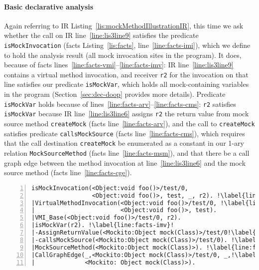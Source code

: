 \paragraph{Basic declarative analysis} Again referring to IR Listing~\ref{lis:mockMethodIllustrationIR}, this time we ask whether the call on IR line~\ref{line:lis3line9} satisfies the predicate \texttt{isMockInvocation} (facts Listing~\ref{lis:facts}, line~\ref{line:facts-imi}), which we define to hold the analysis result (all mock invocation sites in the program). It does, because of facts lines~\ref{line:facts-vmi}--\ref{line:facts-imv}: IR line~\ref{line:lis3line9} contains a virtual method invocation, and receiver \texttt{r2} for the invocation on that line satisfies our predicate \texttt{isMockVar}, which holds all mock-containing variables in the program (Section~\ref{sec:dec-doop} provides more details). Predicate \texttt{isMockVar} holds because of lines~\ref{line:facts-arv}--\ref{line:facts-cms}: \texttt{r2} satisfies \texttt{isMockVar} because IR line~\ref{line:lis3line6} assigns \texttt{r2} the return value from mock source method \texttt{createMock} (facts line~\ref{line:facts-arv}), and the call to \texttt{createMock} satisfies predicate \texttt{callsMockSource} (facts line~\ref{line:facts-cms}), which requires that the call destination \texttt{createMock} be enumerated as a constant in our 1-ary relation \texttt{MockSourceMethod} (facts line~\ref{line:facts-msm}), and that there be a call graph edge between the method invocation at line~\ref{line:lis3line6} and the mock source method (facts line~\ref{line:facts-cge}).


\begin{lstlisting}[basicstyle=\ttfamily, caption={Facts about invocation \texttt{r2.foo()} in method \texttt{test}.},
numbers=left,numbersep=2pt,basicstyle=\scriptsize\ttfamily, framesep=4.5mm, framexleftmargin=1.0mm, captionpos=b, label=lis:facts, escapechar=!, morekeywords={@Test}]
isMockInvocation(<Object:void foo()>/test/0, 
                 <Object:void foo()>, test, _, r2). !\label{line:facts-imi}!
|VirtualMethodInvocation(<Object:void foo()>/test/0, !\label{line:facts-vmi}!
|                        <Object:void foo()>, test).
|VMI_Base(<Object:void foo()>/test/0, r2).
|isMockVar(r2). !\label{line:facts-imv}!
|-AssignReturnValue(<Mockito:Object mock(Class)>/test/0!\label{line:facts-arv}!, r2).
|-callsMockSource(<Mockito:Object mock(Class)>/test/0). !\label{line:facts-cms}!
|MockSourceMethod(<Mockito:Object mock(Class)>). !\label{line:facts-msm}!
|CallGraphEdge(_,<Mockito:Object mock(Class)>/test/0, _,!\label{line:facts-cge}!
|              <Mockito: Object mock(Class)>). 
\end{lstlisting}


